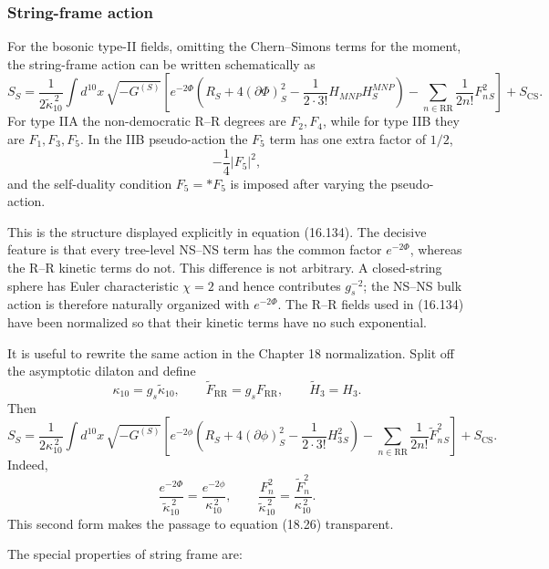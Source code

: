\documentclass[
  10pt,
  a4paper,
  openany]{book}
\begin{document}
\subsubsection{String-frame action}\label{string-frame-action}

For the bosonic type-II fields, omitting the Chern--Simons terms for the
moment, the string-frame action can be written schematically as \[
S_S
=\frac1{2\widetilde\kappa_{10}^{\,2}}
\int d^{10}x\,\sqrt{-G^{(S)}}
\left[
e^{-2\Phi}
\left(
R_S+4(\partial\Phi)^2_S-\frac1{2\cdot3!}H_{MNP}H^{MNP}_S
\right)
-\sum_{n\in\mathrm{RR}}
\frac1{2n!}F_n^2{}_S
\right]
+S_{\mathrm{CS}}.
\] For type IIA the non-democratic R--R degrees are \(F_2,F_4\), while
for type IIB they are \(F_1,F_3,F_5\). In the IIB pseudo-action the
\(F_5\) term has one extra factor of \(1/2\), \[
-\frac14|F_5|^2,
\] and the self-duality condition \(F_5=*F_5\) is imposed after varying
the pseudo-action.

This is the structure displayed explicitly in equation (16.134). The
decisive feature is that every tree-level NS--NS term has the common
factor \(e^{-2\Phi}\), whereas the R--R kinetic terms do not. This
difference is not arbitrary. A closed-string sphere has Euler
characteristic \(\chi=2\) and hence contributes \(g_s^{-2}\); the NS--NS
bulk action is therefore naturally organized with \(e^{-2\Phi}\). The
R--R fields used in (16.134) have been normalized so that their kinetic
terms have no such exponential.

It is useful to rewrite the same action in the Chapter 18 normalization.
Split off the asymptotic dilaton and define \[
\kappa_{10}=g_s\widetilde\kappa_{10},
\qquad
\widetilde F_{\mathrm{RR}}=g_sF_{\mathrm{RR}},
\qquad
\widetilde H_3=H_3.
\] Then \[
S_S
=\frac1{2\kappa_{10}^{\,2}}
\int d^{10}x\,\sqrt{-G^{(S)}}
\left[
e^{-2\phi}
\left(
R_S+4(\partial\phi)^2_S-\frac1{2\cdot3!}H_3^2{}_S
\right)
-\sum_{n\in\mathrm{RR}}
\frac1{2n!}\widetilde F_n^2{}_S
\right]
+S_{\mathrm{CS}}.
\] Indeed, \[
\frac{e^{-2\Phi}}{\widetilde\kappa_{10}^{\,2}}
=\frac{e^{-2\phi}}{\kappa_{10}^{\,2}},
\qquad
\frac{F_n^2}{\widetilde\kappa_{10}^{\,2}}
=\frac{\widetilde F_n^2}{\kappa_{10}^{\,2}}.
\] This second form makes the passage to equation (18.26) transparent.

The special properties of string frame are:
\end{document}
